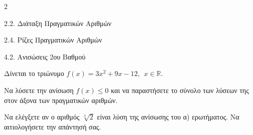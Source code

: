 \begin{ylh}{2}
    \item 2.2. Διάταξη Πραγματικών Αριθμών
    \item 2.4. Ρίζες Πραγματικών Αριθμών
    \item 4.2. Ανισώσεις 2ου Βαθμού
\end{ylh}
Δίνεται το τριώνυμο $f(x) = 3x^{2} + 9x - 12,\ \ x \in \mathbb{R.}$
\begin{alist}
\item Να λύσετε την ανίσωση $f(x) \leq 0$ και να παραστήσετε το σύνολο των λύσεων της στον άξονα των πραγματικών αριθμών.
\item Να ελέγξετε αν ο αριθμός $\sqrt[3]{2}$ είναι λύση της ανίσωσης του α) ερωτήματος. Να αιτιολογήσετε την απάντησή σας.
\end{alist}

